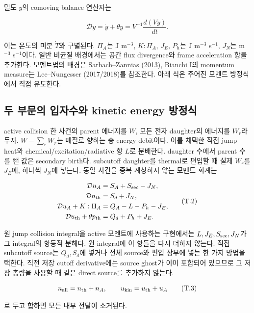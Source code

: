 밀도 \(y\)의 comoving balance 연산자는

\[
\mathcal D y=\dot y+\theta y=V^{-1}\frac{d(Vy)}{dt}.
\tag{T.1}
\]

이는 온도의 미분 \(\dot T\)와 구별된다. \(\Pi_A\)는 J m\(^{-3}\), \(K:\Pi_A\), \(J_E\), \(P_h\)는 J m\(^{-3}\) s\(^{-1}\), \(J_N\)는 m\(^{-3}\) s\(^{-1}\)이다. 일반 비균질 배경에서는 공간 flux divergence와 frame acceleration 항을 추가한다. 모멘트법의 배경은 Sarbach--Zannias (2013), Bianchi I의 momentum measure는 Lee--Nungesser (2017/2018)를 참조한다. 아래 식은 주어진 모멘트 방정식에서 직접 유도한다.

\hypertarget{uxb450-uxbd80uxbb38uxc758-uxc785uxc790uxc218uxc640-kinetic-energy-uxbc29uxc815uxc2dd}{%
\subsection{두 부문의 입자수와 kinetic energy 방정식}\label{uxb450-uxbd80uxbb38uxc758-uxc785uxc790uxc218uxc640-kinetic-energy-uxbc29uxc815uxc2dd}}

active collision 한 사건의 parent 에너지를 \(W\), 모든 전자 daughter의 에너지를 \(W_r\)라 두자. \(W-\sum_rW_r\)는 매질로 향하는 총 energy debit이다. 이를 채택한 직접 jump heat와 chemical/excitation/radiative 항 \(L\)로 분배한다. daughter 수에서 parent 수를 뺀 값은 secondary birth다. subcutoff daughter를 thermal로 편입할 때 실제 \(W_r\)를 \(J_E\)에, 하나씩 \(J_N\)에 넣는다. 동일 사건을 중복 계상하지 않는 모멘트 회계는

\[
\begin{aligned}
\mathcal D n_A &= S_A+S_{\rm sec}-J_N,\\
\mathcal D n_{\rm th} &= S_d+J_N,\\
\mathcal D u_A+K:\Pi_A &= Q_A-L-P_h-J_E,\\
\mathcal D u_{\rm th}+\theta p_{\rm th} &= Q_d+P_h+J_E.
\end{aligned}
\tag{T.2}
\]

원 jump collision integral을 active 모멘트에 사용하는 구현에서는 \(L,J_E,S_{\rm sec},J_N\)가 그 integral의 항등적 분해다. 원 integral에 이 항들을 다시 더하지 않는다. 직접 subcutoff source는 \(Q_d,S_d\)에 넣거나 전체 source와 편입 장부에 넣는 한 가지 방법을 택한다. 직전 저장 cutoff derivative에는 source ghost가 이미 포함되어 있으므로 그 저장 총량을 사용할 때 같은 direct source를 추가하지 않는다.

\[
n_{\rm all}=n_{\rm th}+n_A,\qquad u_{\rm kin}=u_{\rm th}+u_A
\tag{T.3}
\]

로 두고 합하면 모든 내부 전달이 소거된다.

